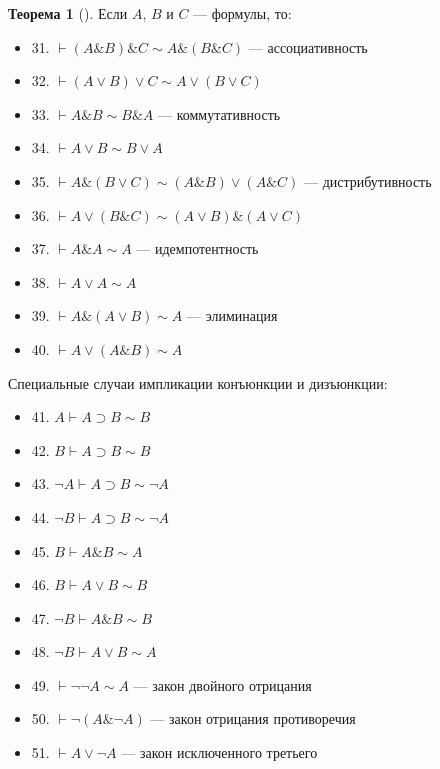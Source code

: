 \documentclass[a4paper, 12pt]{article}  %
\DeclareMathOperator{\conj}{\mathbb{\&}}
\theoremstyle{definition}
\newtheorem{theorem}{Теорема}
\begin{document}
	\begin{theorem}[]
		Если $A$, $B$ и $C$ --- формулы, то:
		\begin{itemize}[label={}]
			\setlength\itemsep{0pt}	
			\item 31. $\vdash (A \conj B) \conj C \sim A \conj (B \conj C)$ --- ассоциативность			
			\item 32. $\vdash (A \vee B) \vee C \sim A \vee (B \vee C)$				
			\item 33. $\vdash  A \conj B \sim B \conj A$  --- коммутативность			
			\item 34. $\vdash  A \vee B \sim B \vee A$
			\item 35. $\vdash A \conj (B \vee C) \sim (A \conj B) \vee (A \conj C)$ --- дистрибутивность				
			\item 36. $\vdash A \vee (B \conj C) \sim (A \vee B) \conj (A \vee C)$				
			\item 37. $\vdash A \conj A \sim A$ --- идемпотентность 				
			\item 38. $\vdash A \vee A \sim A$		
			\item 39. $\vdash A \conj (A \vee B) \sim A$ --- элиминация			
			\item 40. $\vdash A \vee (A \conj B) \sim A$
		\end{itemize}
		
		Специальные случаи импликации конъюнкции и дизъюнкции:
		\begin{itemize}[label={}]
			\setlength\itemsep{0pt}	
			\item 41. $A \vdash A \supset B \sim B$			
			\item 42. $B \vdash A \supset B \sim B$			
			\item 43. $\neg A \vdash A \supset B \sim \neg A$			
			\item 44. $\neg B \vdash A \supset B \sim \neg A$			
			\item 45. $B \vdash A \conj B \sim A$			
			\item 46. $B \vdash A \vee B \sim B$		
			\item 47. $\neg B \vdash A \conj B \sim B$		
			\item 48. $\neg B \vdash A \vee B \sim A$
		\end{itemize}
		
		\begin{itemize}[label={}]
			\setlength\itemsep{0pt}	
			\item 49. $\vdash \neg \neg A \sim A$ --- закон двойного отрицания		
			\item 50. $\vdash \neg (A \conj \neg A)$ --- закон отрицания противоречия		
			\item 51. $\vdash A \vee \neg A$ --- закон исключенного третьего
		\end{itemize}
		

\end{theorem}
\end{document}
